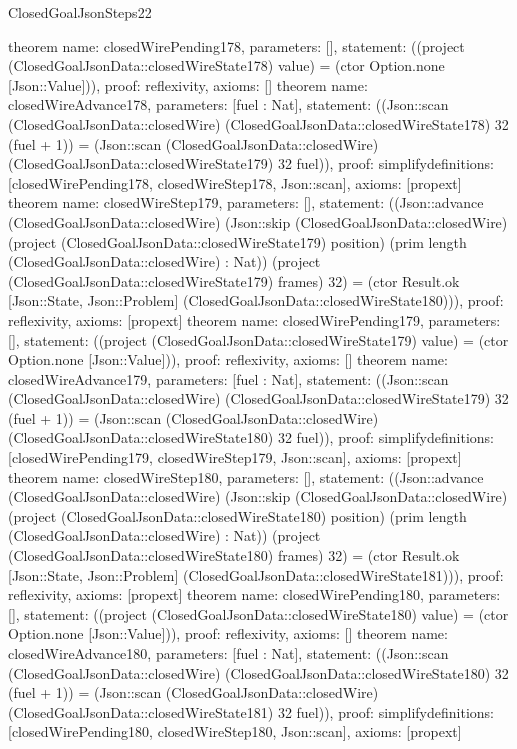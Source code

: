 \begin{lexlean}{ClosedGoalJsonSteps22}
\begin{semanticmodule}
{}
theorem{
 name: closedWirePending178, parameters: [],
 statement: ((project (ClosedGoalJsonData::closedWireState178) value) = (ctor Option.none [Json::Value])), proof: reflexivity{}, axioms: []
}
theorem{
 name: closedWireAdvance178, parameters: [fuel : Nat],
 statement: ((Json::scan (ClosedGoalJsonData::closedWire) (ClosedGoalJsonData::closedWireState178) 32 (fuel + 1)) = (Json::scan (ClosedGoalJsonData::closedWire) (ClosedGoalJsonData::closedWireState179) 32 fuel)), proof: simplify{definitions: [closedWirePending178, closedWireStep178, Json::scan]}, axioms: [propext]
}
theorem{
 name: closedWireStep179, parameters: [],
 statement: ((Json::advance (ClosedGoalJsonData::closedWire) (Json::skip (ClosedGoalJsonData::closedWire) (project (ClosedGoalJsonData::closedWireState179) position) (prim length (ClosedGoalJsonData::closedWire) : Nat)) (project (ClosedGoalJsonData::closedWireState179) frames) 32) = (ctor Result.ok [Json::State, Json::Problem] (ClosedGoalJsonData::closedWireState180))), proof: reflexivity{}, axioms: [propext]
}
theorem{
 name: closedWirePending179, parameters: [],
 statement: ((project (ClosedGoalJsonData::closedWireState179) value) = (ctor Option.none [Json::Value])), proof: reflexivity{}, axioms: []
}
theorem{
 name: closedWireAdvance179, parameters: [fuel : Nat],
 statement: ((Json::scan (ClosedGoalJsonData::closedWire) (ClosedGoalJsonData::closedWireState179) 32 (fuel + 1)) = (Json::scan (ClosedGoalJsonData::closedWire) (ClosedGoalJsonData::closedWireState180) 32 fuel)), proof: simplify{definitions: [closedWirePending179, closedWireStep179, Json::scan]}, axioms: [propext]
}
theorem{
 name: closedWireStep180, parameters: [],
 statement: ((Json::advance (ClosedGoalJsonData::closedWire) (Json::skip (ClosedGoalJsonData::closedWire) (project (ClosedGoalJsonData::closedWireState180) position) (prim length (ClosedGoalJsonData::closedWire) : Nat)) (project (ClosedGoalJsonData::closedWireState180) frames) 32) = (ctor Result.ok [Json::State, Json::Problem] (ClosedGoalJsonData::closedWireState181))), proof: reflexivity{}, axioms: [propext]
}
theorem{
 name: closedWirePending180, parameters: [],
 statement: ((project (ClosedGoalJsonData::closedWireState180) value) = (ctor Option.none [Json::Value])), proof: reflexivity{}, axioms: []
}
theorem{
 name: closedWireAdvance180, parameters: [fuel : Nat],
 statement: ((Json::scan (ClosedGoalJsonData::closedWire) (ClosedGoalJsonData::closedWireState180) 32 (fuel + 1)) = (Json::scan (ClosedGoalJsonData::closedWire) (ClosedGoalJsonData::closedWireState181) 32 fuel)), proof: simplify{definitions: [closedWirePending180, closedWireStep180, Json::scan]}, axioms: [propext]
}
\end{semanticmodule}
\end{lexlean}
